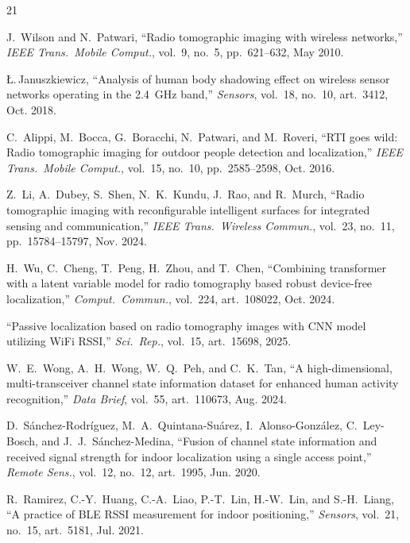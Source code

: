 \documentclass[journal,10pt]{IEEEtran}
\begin{document}
\begin{thebibliography}{21}

 J.~Wilson and N.~Patwari, ``Radio tomographic imaging with wireless networks,'' \emph{IEEE Trans.\ Mobile Comput.}, vol.~9, no.~5, pp.~621--632, May 2010.

 {\L}.\,Januszkiewicz, ``Analysis of human body shadowing effect on wireless sensor networks operating in the 2.4~GHz band,'' \emph{Sensors}, vol.~18, no.~10, art.~3412, Oct. 2018.

 C.~Alippi, M.~Bocca, G.~Boracchi, N.~Patwari, and M.~Roveri, ``RTI goes wild: Radio tomographic imaging for outdoor people detection and localization,'' \emph{IEEE Trans.\ Mobile Comput.}, vol.~15, no.~10, pp.~2585--2598, Oct. 2016.

 Z.~Li, A.~Dubey, S.~Shen, N.~K.~Kundu, J.~Rao, and R.~Murch, ``Radio tomographic imaging with reconfigurable intelligent surfaces for integrated sensing and communication,'' \emph{IEEE Trans.\ Wireless Commun.}, vol.~23, no.~11, pp.~15784--15797, Nov. 2024.

 H.~Wu, C.~Cheng, T.~Peng, H.~Zhou, and T.~Chen, ``Combining transformer with a latent variable model for radio tomography based robust device-free localization,'' \emph{Comput.\ Commun.}, vol.~224, art.~108022, Oct. 2024.

 ``Passive localization based on radio tomography images with CNN model utilizing WiFi RSSI,'' \emph{Sci.\ Rep.}, vol.~15, art.~15698, 2025.

 W.~E.~Wong, A.~H.~Wong, W.~Q.~Peh, and C.~K.~Tan, ``A high-dimensional, multi-transceiver channel state information dataset for enhanced human activity recognition,'' \emph{Data Brief}, vol.~55, art.~110673, Aug. 2024.

 D.~S\'anchez-Rodr\'iguez, M.~A.~Quintana-Su\'arez, I.~Alonso-Gonz\'alez, C.~Ley-Bosch, and J.~J.~S\'anchez-Medina, ``Fusion of channel state information and received signal strength for indoor localization using a single access point,'' \emph{Remote Sens.}, vol.~12, no.~12, art.~1995, Jun. 2020.

 R.~Ramirez, C.-Y.~Huang, C.-A.~Liao, P.-T.~Lin, H.-W.~Lin, and S.-H.~Liang, ``A practice of BLE RSSI measurement for indoor positioning,'' \emph{Sensors}, vol.~21, no.~15, art.~5181, Jul. 2021.


\end{thebibliography}
\end{document}
